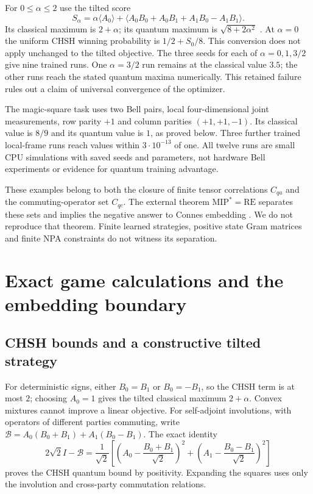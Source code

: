 \documentclass[11pt,oneside,openany]{book}
\theoremstyle{definition}\newtheorem{definition}[theorem]{Definition}
\theoremstyle{remark}\newtheorem{remark}[theorem]{Remark}
\begin{document}
For $0\le\alpha\le2$ use the tilted score
\[
 S_\alpha=\alpha\langle A_0\rangle+
 \langle A_0B_0+A_0B_1+A_1B_0-A_1B_1\rangle.
\]
Its classical maximum is $2+\alpha$; its quantum maximum is
$\sqrt{8+2\alpha^2}$ \cite{GameTilted}. At $\alpha=0$ the uniform CHSH winning
probability is $1/2+S_0/8$. This conversion does not apply unchanged to the
tilted objective. The three seeds for each of $\alpha=0,1,3/2$ give nine
trained runs. One $\alpha=3/2$ run remains at the classical value $3.5$;
the other runs reach the stated quantum maxima numerically. This retained
failure rules out a claim of universal convergence of the optimizer.

The magic-square task uses two Bell pairs, local four-dimensional joint
measurements, row parity $+1$ and column parities $(+1,+1,-1)$. Its classical
value is $8/9$ and its quantum value is $1$, as proved below. Three further
trained local-frame runs reach values within $3\cdot10^{-13}$ of one.
All twelve runs are small CPU simulations with saved seeds and parameters,
not hardware Bell experiments or evidence for quantum training advantage.

These examples belong to both the closure of finite tensor correlations
$C_{qa}$ and the commuting-operator set $C_{qc}$. The external theorem
$\mathrm{MIP}^*=\mathrm{RE}$ separates these sets and implies the negative
answer to Connes embedding \cite{GameMIP}. We do not reproduce that theorem.
Finite learned strategies, positive state Gram matrices and finite NPA
constraints do not witness its separation.

\section{Exact game calculations and the embedding boundary}
\subsection{CHSH bounds and a constructive tilted strategy}
For deterministic signs, either $B_0=B_1$ or $B_0=-B_1$, so the CHSH term is
at most $2$; choosing $A_0=1$ gives the tilted classical maximum $2+\alpha$.
Convex mixtures cannot improve a linear objective. For self-adjoint
involutions, with operators of different parties commuting, write
$\mathcal B=A_0(B_0+B_1)+A_1(B_0-B_1)$. The exact identity
\[
 2\sqrt2I-\mathcal B=\frac1{\sqrt2}
 \left[\left(A_0-\frac{B_0+B_1}{\sqrt2}\right)^2+
       \left(A_1-\frac{B_0-B_1}{\sqrt2}\right)^2\right]
\]
proves the CHSH quantum bound by positivity. Expanding the squares uses only
the involution and cross-party commutation relations.
\end{document}
